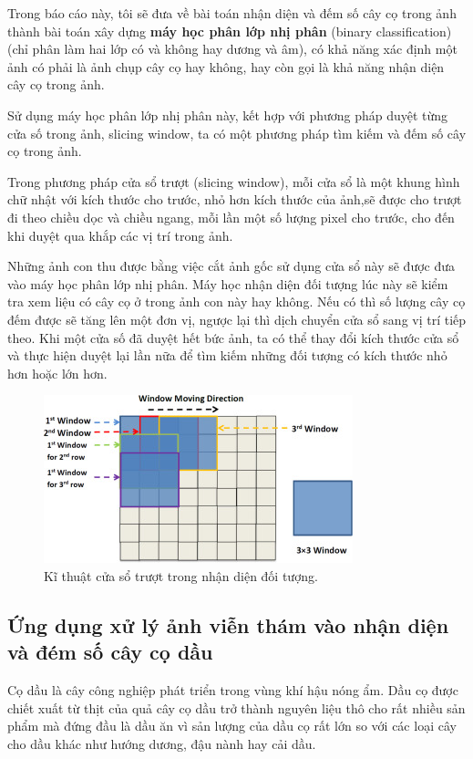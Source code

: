 \documentclass[14pt, oneside, a4paper, openany]{scrartcl}
\begin{document}
Trong báo cáo này, tôi sẽ đưa về bài toán nhận diện và đếm số cây cọ trong ảnh thành bài toán xây dựng \textbf{máy học phân lớp nhị phân} (binary classification) (chỉ phân làm hai lớp có và không hay dương và âm), có khả năng xác định một ảnh có phải là ảnh chụp cây cọ hay không, hay còn gọi là khả năng nhận diện cây cọ trong ảnh.

Sử dụng máy học phân lớp nhị phân này, kết hợp với phương pháp duyệt từng cửa số trong ảnh, slicing window, ta có một phương pháp tìm kiếm và đếm số cây cọ trong ảnh.

Trong phương pháp cửa sổ trượt (slicing window), mỗi cửa sổ là một khung hình chữ nhật với kích thước cho trước, nhỏ hơn kích thước của ảnh,sẽ được cho trượt đi theo chiều dọc và chiều ngang, mỗi lần một số lượng pixel cho trước, cho đến khi duyệt qua khắp các vị trí trong ảnh. 

Những ảnh con thu được bằng việc cắt ảnh gốc sử dụng cửa sổ này sẽ được đưa vào máy học phân lớp nhị phân. Máy học nhận diện đối tượng lúc này sẽ kiểm tra xem liệu có cây cọ ở trong ảnh con này hay không. Nếu có thì số lượng cây cọ đếm được sẽ tăng lên một đơn vị, ngược lại thì dịch chuyển cửa sổ sang vị trí tiếp theo. Khi một cửa số đã duyệt hết bức ảnh, ta có thể thay đổi kích thước cửa sổ và thực hiện duyệt lại lần nữa để tìm kiếm những đối tượng có kích thước nhỏ hơn hoặc lớn hơn.

\begin{figure}
	\centering
	\includegraphics[scale=1]{figures/slicingWindow.jpg} 
	\caption[Kĩ thuật cửa sổ trượt]{Kĩ thuật cửa sổ trượt trong nhận diện đối tượng.}
\end{figure}


\subsection{Ứng dụng xử lý ảnh viễn thám vào nhận diện và đém số cây cọ dầu}
Cọ dầu là cây công nghiệp phát triển trong vùng khí hậu nóng ẩm. Dầu cọ được chiết xuất từ thịt của quả cây cọ dầu trở thành nguyên liệu thô cho rất nhiều sản phẩm mà đứng đầu là dầu ăn vì sản lượng của dầu cọ rất lớn so với các loại cây cho dầu khác như hướng dương, đậu nành hay cải dầu. 
\end{document}

